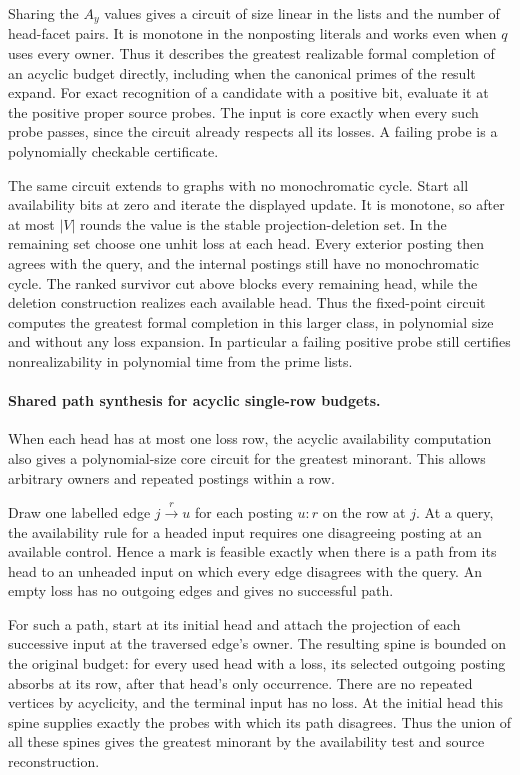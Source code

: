 Sharing the $A_y$ values gives a circuit of size
linear in the lists and the number of head-facet
pairs. It is monotone in the nonposting literals
and works even when $q$ uses every owner. Thus it
describes the greatest realizable formal
completion of an acyclic budget directly, including
when the canonical primes of the result expand.
For exact recognition of a candidate with a
positive bit, evaluate it at the positive proper
source probes. The input is core exactly when
every such probe passes,
since the circuit already respects all its losses.
A failing probe is a polynomially checkable
certificate.

The same circuit extends to graphs with no
monochromatic cycle. Start all availability bits
at zero and iterate the displayed update. It is
monotone, so after at most $|V|$ rounds the value
is the stable projection-deletion set. In the
remaining set choose one unhit loss at each head.
Every exterior posting then agrees with the query,
and the internal postings still have no monochromatic
cycle. The ranked survivor cut above blocks every
remaining head, while the deletion construction
realizes each available head. Thus the fixed-point
circuit computes the greatest formal completion
in this larger class, in polynomial size and
without any loss expansion. In particular a failing
positive probe still certifies nonrealizability
in polynomial time from the prime lists.

\paragraph{Shared path synthesis for acyclic single-row budgets.}
When each head has at most one loss row, the acyclic
availability computation also gives a polynomial-size
core circuit for the greatest minorant. This allows
arbitrary owners and repeated postings within a row.

Draw one labelled edge $j\xrightarrow{r}u$ for each
posting $u{:}r$ on the row at $j$. At a query, the
availability rule for a headed input requires one
disagreeing posting at an available control.
Hence a mark is feasible exactly when there
is a path from its head to an unheaded input
on which every edge disagrees with the query.
An empty loss has no outgoing edges and gives
no successful path.

For such a path, start at its initial head and
attach the projection of each successive input
at the traversed edge's owner. The resulting
spine is bounded on the original budget: for
every used head with a loss, its selected
outgoing posting absorbs at its row, after
that head's only occurrence. There are no
repeated vertices by acyclicity, and the
terminal input has no loss. At the initial
head this spine supplies exactly the probes
with which its path disagrees. Thus the union
of all these spines gives the greatest minorant
by the availability test and source reconstruction.

